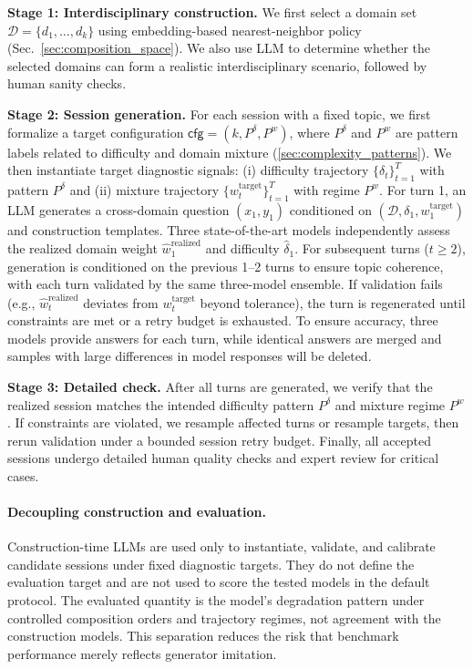 \textbf{Stage 1: Interdisciplinary construction.}
We first select a domain set $\mathcal{D} = \{d_1, \ldots, d_k\}$ using embedding-based nearest-neighbor policy (Sec.~\ref{sec:composition_space}).
We also use LLM to determine whether the selected domains can form a realistic interdisciplinary scenario, followed by human sanity checks.

\textbf{Stage 2: Session generation.}
For each session with a fixed topic, we first formalize a target configuration $\mathsf{cfg} = (k, P^\delta, P^w)$, where $P^\delta$ and $P^w$ are pattern labels related to difficulty and domain mixture (\cref{sec:complexity_patterns}).
We then instantiate target diagnostic signals: (i) difficulty trajectory $\{\delta_t\}_{t=1}^{T}$ with pattern $P^\delta$ and (ii) mixture trajectory $\{w_t^{\text{target}}\}_{t=1}^{T}$ with regime $P^w$.
For turn 1, an LLM generates a cross-domain question $(x_1, y_1)$ conditioned on $(\mathcal{D}, \delta_1, w_1^{\text{target}})$ and construction templates.
Three state-of-the-art models independently assess the realized domain weight $\hat{w}_1^{\text{realized}}$ and difficulty $\hat{\delta}_1$.
For subsequent turns ($t \geq 2$), generation is conditioned on the previous 1--2 turns to ensure topic coherence, with each turn validated by the same three-model ensemble.
If validation fails (e.g., $\hat{w}_t^{\text{realized}}$ deviates from $w_t^{\text{target}}$ beyond tolerance), the turn is regenerated until constraints are met or a retry budget is exhausted.
To ensure accuracy, three models provide answers for each turn, while identical answers are merged and samples with large differences in model responses will be deleted.

\textbf{Stage 3: Detailed check.}
After all turns are generated, we verify that the realized session matches the intended difficulty pattern $P^\delta$ and mixture regime $P^w$.
If constraints are violated, we resample affected turns or resample targets, then rerun validation under a bounded session retry budget.
Finally, all accepted sessions undergo detailed human quality checks and expert review for critical cases.
\vspace{-0.5mm}

\paragraph{Decoupling construction and evaluation.}
Construction-time LLMs are used only to instantiate, validate, and calibrate candidate sessions under fixed diagnostic targets.
They do not define the evaluation target and are not used to score the tested models in the default protocol.
The evaluated quantity is the model's degradation pattern under controlled composition orders and trajectory regimes, 
not agreement with the construction models.
This separation reduces the risk that benchmark performance merely reflects generator imitation.
\vspace{-0.5mm}


